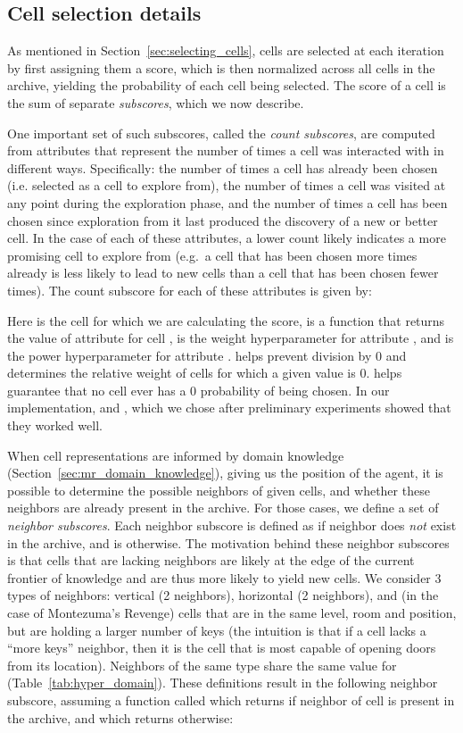 \documentclass{article}
\begin{document}
\subsection{Cell selection details}
\label{sec:selection_details}

As mentioned in Section~\ref{sec:selecting_cells}, cells are selected at each iteration by first assigning them a score, which is then normalized across all cells in the archive, yielding the probability of each cell being selected. The score of a cell is the sum of separate \emph{subscores}, which we now describe.

One important set of such subscores, called the \emph{count subscores}, are computed from attributes that represent the number of times a cell was interacted with in different ways. Specifically: the number of times a cell has already been chosen (i.e. selected as a cell to explore from), the number of times a cell was visited at any point during the exploration phase, and the number of times a cell has been chosen since exploration from it last produced the discovery of a new or better cell. In the case of each of these attributes, a lower count likely indicates a more promising cell to explore from (e.g.\ a cell that has been chosen more times already is less likely to lead to new cells than a cell that has been chosen fewer times).
The count subscore for each of these attributes is given by:



Here  is the cell for which we are calculating the score,  is a function that returns the value of attribute  for cell ,  is the weight hyperparameter for attribute , and  is the power hyperparameter for attribute .  helps prevent division by 0 and determines the relative weight of cells for which a given value is 0.  helps guarantee that no cell ever has a 0 probability of being chosen. In our implementation,  and , which we chose after preliminary experiments showed that they worked well.

When cell representations are informed by domain knowledge (Section~\ref{sec:mr_domain_knowledge}), giving us the  position of the agent, it is possible to determine the possible neighbors of given cells, and whether these neighbors are already present in the archive.
For those cases, we define a set of \emph{neighbor subscores}. Each neighbor subscore is defined as  if neighbor  does \emph{not} exist in the archive, and is  otherwise.
The motivation behind these neighbor subscores is that cells that are lacking neighbors are likely at the edge of the current frontier of knowledge and are thus more likely to yield new cells. We consider 3 types of neighbors: vertical (2 neighbors), horizontal (2 neighbors), and (in the case of Montezuma's Revenge) cells that are in the same level, room and  position, but are holding a larger number of keys (the intuition is that if a cell lacks a ``more keys'' neighbor, then it is the cell that is most capable of opening doors from its location). Neighbors of the same type share the same value for  (Table~\ref{tab:hyper_domain}). These definitions result in the following neighbor subscore, assuming a function called  which returns  if neighbor  of cell  is present in the archive, and which returns  otherwise:
\end{document}
